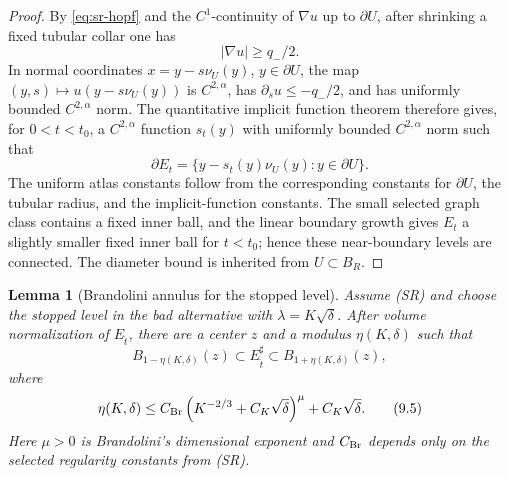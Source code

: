 \documentclass[11pt]{article}
\newtheorem{lemma}[theorem]{Lemma}
\begin{document}
\begin{proof}
By \eqref{eq:sr-hopf} and the \(C^{1}\)-continuity of \(\nabla u\) up to
\(\partial U\), after shrinking a fixed tubular collar one has
\[
   |\nabla u|\ge q_-/2.
   \tag{9.2}
\]
In normal coordinates \(x=y-s\nu_U(y)\), \(y\in\partial U\), the map
\((y,s)\mapsto u(y-s\nu_U(y))\) is \(C^{2,\alpha}\), has
\(\partial_s u\le -q_-/2\), and has uniformly bounded \(C^{2,\alpha}\) norm.
The quantitative implicit function theorem therefore gives, for
\(0<t<t_0\), a \(C^{2,\alpha}\) function \(s_t(y)\) with uniformly bounded
\(C^{2,\alpha}\) norm such that
\[
   \partial E_t=\{y-s_t(y)\nu_U(y):y\in\partial U\}.
   \tag{9.3}
\]
The uniform atlas constants follow from the corresponding constants for
\(\partial U\), the tubular radius, and the implicit-function constants.
The small selected graph class contains a fixed inner ball, and the linear
boundary growth gives \(E_t\) a slightly smaller fixed inner ball for
\(t<t_0\); hence these near-boundary levels are connected.  The diameter
bound is inherited from \(U\subset B_R\).
\end{proof}

\begin{lemma}[Brandolini annulus for the stopped level]
\label{lem:brandolini-annulus-selected}
Assume \emph{(SR)} and choose the stopped level in the bad alternative with
\(\lambda=K\sqrt\delta\).  After volume normalization of \(E_{\hat t}\), there
are a center \(z\) and a modulus \(\eta(K,\delta)\) such that
\[
   B_{1-\eta(K,\delta)}(z)
      \subset E_{\hat t}^{\sharp}
      \subset B_{1+\eta(K,\delta)}(z),
   \tag{9.4}\label{eq:selected-annulus}
\]
where
\[
   \eta(K,\delta)
      \le
      C_{\rm Br}\left(K^{-2/3}+C_K\sqrt\delta\right)^\mu
      +C_K\sqrt\delta.
   \tag{9.5}\label{eq:eta-K}
\]
Here \(\mu>0\) is Brandolini's dimensional exponent and
\(C_{\rm Br}\) depends only on the selected regularity constants from
\emph{(SR)}.
\end{lemma}
\end{document}
